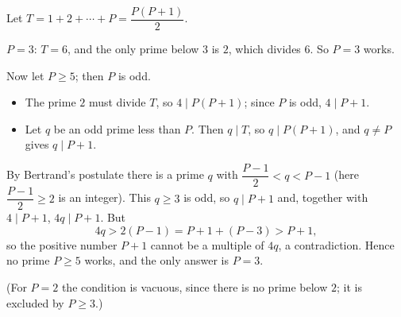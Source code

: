 Let $T=1+2+\cdots+P=\dfrac{P(P+1)}{2}$.

$P=3$: $T=6$, and the only prime below $3$ is $2$, which divides $6$. So $P=3$ works.

Now let $P\ge5$; then $P$ is odd.
\begin{itemize}
\item The prime $2$ must divide $T$, so $4\mid P(P+1)$; since $P$ is odd, $4\mid P+1$.
\item Let $q$ be an odd prime less than $P$. Then $q\mid T$, so $q\mid P(P+1)$, and $q\ne P$ gives $q\mid P+1$.
\end{itemize}
By Bertrand's postulate there is a prime $q$ with $\dfrac{P-1}{2}<q<P-1$ (here $\dfrac{P-1}{2}\ge2$ is an integer). This $q\ge3$ is odd, so $q\mid P+1$ and, together with $4\mid P+1$, $4q\mid P+1$. But
\[
4q>2(P-1)=P+1+(P-3)>P+1 ,
\]
so the positive number $P+1$ cannot be a multiple of $4q$, a contradiction. Hence no prime $P\ge5$ works, and the only answer is $\boxed{P=3}$.

(For $P=2$ the condition is vacuous, since there is no prime below $2$; it is excluded by $P\ge3$.)
